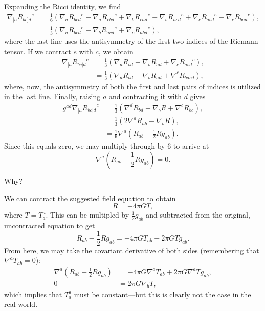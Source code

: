 \documentclass[../road-to-reality.tex]{subfiles}
\begin{document}
\begin{questions}
  \begin{solution}
    Expanding the Ricci identity, we find
    \begin{align*}
      \nabla_{[a}{R_{bc]d}}^e &= \frac{1}{6}(\nabla_a{R_{bcd}}^e - \nabla_a{R_{cbd}}^e + \nabla_b{R_{cad}}^e - \nabla_b{R_{acd}}^e + \nabla_c{R_{abd}}^e - \nabla_c{R_{bad}}^e), \\
&= \frac{1}{3}(\nabla_a{R_{bcd}}^e - \nabla_b{R_{acd}}^e + \nabla_c{R_{abd}}^e),
    \end{align*}
    where the last line uses the antisymmetry of the first two indices of the
    Riemann tensor. If we contract $e$ with $c$, we obtain
    \begin{align*}
      \nabla_{[a}{R_{bc]d}}^c &= \frac{1}{3}(\nabla_aR_{bd} - \nabla_bR_{ad} + \nabla_c{R_{abd}}^c), \\
      &= \frac{1}{3}(\nabla_aR_{bd} - \nabla_bR_{ad} + \nabla^cR_{bacd}),
    \end{align*}
    where, now, the antisymmetry of both the first and last pairs of indices is
    utilized in the last line. Finally, raising $a$ and contracting it with $d$
    gives
    \begin{align*}
      g^{ad}\nabla_{[a}{R_{bc]d}}^c &= \frac{1}{3}(\nabla^dR_{bd} - \nabla_bR + \nabla^cR_{bc}), \\
                                    &= \frac{1}{3}(2\nabla^aR_{ab} - \nabla_bR), \\
      &= \frac{1}{6}\nabla^a(R_{ab} - \frac{1}{2}Rg_{ab}).
    \end{align*}
    Since this equals zero, we may multiply through by $6$ to arrive at
    \[
      \nabla^a(R_{ab} - \frac{1}{2}Rg_{ab}) = 0.
    \]
  \end{solution}

\question Why?

  \begin{solution}
    We can contract the suggested field equation to obtain
    \[
      R = -4\pi{G}T,
    \]
    where $T = T_a^a$. This can be multipled by $\frac{1}{2}g_{ab}$ and
    subtracted from the original, uncontracted equation to get
    \[
      R_{ab} - \frac{1}{2}Rg_{ab} = -4\pi{G}T_{ab} + 2{\pi}GTg_{ab}.
    \]
    From here, we may take the covariant derivative of both sides (remembering
    that $\nabla^aT_{ab}=0$):
    \begin{align*}
      \nabla^a(R_{ab}-\frac{1}{2}Rg_{ab}) &= -4\pi{G}\nabla^aT_{ab} + 2\pi{G}\nabla^aTg_{ab}, \\
      0 &= 2\pi{G}\nabla_bT,
    \end{align*}
    which implies that $T_a^a$ must be constant---but this is clearly not the
    case in the real world.
  \end{solution}


\end{questions}
\end{document}
